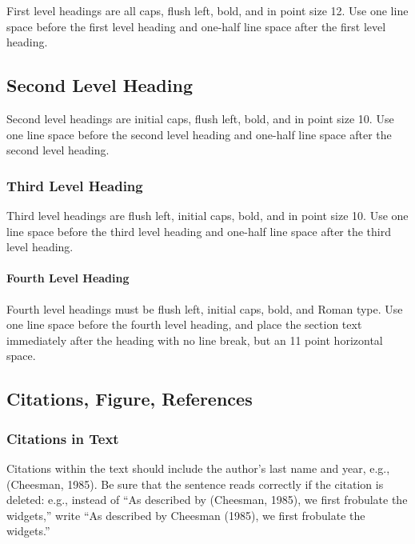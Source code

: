 \documentclass[twoside]{article}
\begin{document}
First level headings are all caps, flush left, bold, and in point size
12. Use one line space before the first level heading and one-half line space
after the first level heading.

\subsection{Second Level Heading}

Second level headings are initial caps, flush left, bold, and in point
size 10. Use one line space before the second level heading and one-half line
space after the second level heading.

\subsubsection{Third Level Heading}

Third level headings are flush left, initial caps, bold, and in point
size 10. Use one line space before the third level heading and one-half line
space after the third level heading.

\paragraph{Fourth Level Heading}

Fourth level headings must be flush left, initial caps, bold, and
Roman type.  Use one line space before the fourth level heading, and
place the section text immediately after the heading with no line
break, but an 11 point horizontal space.

\subsection{Citations, Figure, References}


\subsubsection{Citations in Text}

Citations within the text should include the author's last name and
year, e.g., (Cheesman, 1985). 
Be sure that the sentence reads
correctly if the citation is deleted: e.g., instead of ``As described
by (Cheesman, 1985), we first frobulate the widgets,'' write ``As
described by Cheesman (1985), we first frobulate the widgets.''
\end{document}
